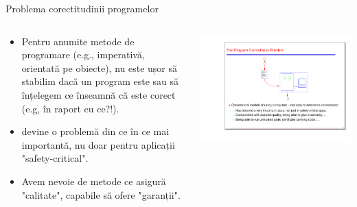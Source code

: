 \documentclass[xcolor=pdftex,romanian,colorlinks]{beamer}
\begin{document}
\begin{frame}{Problema corectitudinii programelor}

\begin{columns}
\begin{column}{.65\textwidth}
\begin{itemize}
	\item Pentru anumite metode de programare (e.g., imperativă, orientată pe obiecte), nu este ușor să stabilim dacă un program este  sau să  înțelegem ce  înseamnă că este corect (e.g,  în raport cu ce?!). 
	\item {} devine o problemă din ce  în ce mai importantă, nu doar pentru aplicații "safety-critical".
	\item Avem nevoie de metode ce asigură "calitate", capabile să ofere "garanții".
\end{itemize}
\end{column}
\begin{column}{.4\textwidth}
\includegraphics[scale=0.4]{img/imagine1}
\end{column}
\end{columns}
\end{frame}
\end{document}
